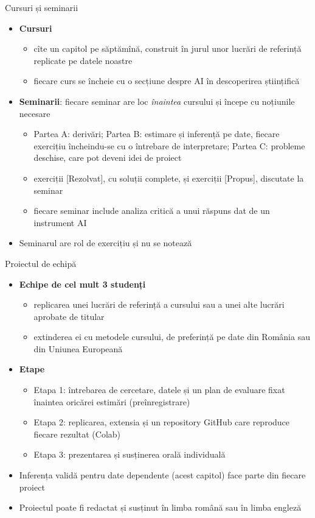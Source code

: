 \begin{frame}{Cursuri și seminarii}
\itemsize{\footnotesize}
\begin{itemize}
    \item \textbf{Cursuri}
    \begin{itemize}
        \item cîte un capitol pe săptămînă, construit în jurul unor lucrări de referință replicate pe datele noastre
        \item fiecare curs se încheie cu o secțiune despre AI în descoperirea științifică
    \end{itemize}
    \item \textbf{Seminarii}: fiecare seminar are loc \emph{înaintea} cursului și începe cu noțiunile necesare
    \begin{itemize}
        \item Partea A: derivări; Partea B: estimare și inferență pe date, fiecare exercițiu încheindu-se cu o întrebare de interpretare; Partea C: probleme deschise, care pot deveni idei de proiect
        \item exerciții [Rezolvat], cu soluții complete, și exerciții [Propus], discutate la seminar
        \item fiecare seminar include analiza critică a unui răspuns dat de un instrument AI
    \end{itemize}
    \item Seminarul are rol de exercițiu și nu se notează
\end{itemize}
\end{frame}

\begin{frame}{Proiectul de echipă}
\itemsize{\footnotesize}
\begin{itemize}
    \item \textbf{Echipe de cel mult 3 studenți}
    \begin{itemize}
        \item replicarea unei lucrări de referință a cursului sau a unei alte lucrări aprobate de titular
        \item extinderea ei cu metodele cursului, de preferință pe date din România sau din Uniunea Europeană
    \end{itemize}
    \item \textbf{Etape}
    \begin{itemize}
        \item Etapa 1: întrebarea de cercetare, datele și un plan de evaluare fixat înaintea oricărei estimări (preînregistrare)
        \item Etapa 2: replicarea, extensia și un repository GitHub care reproduce fiecare rezultat (Colab)
        \item Etapa 3: prezentarea și susținerea orală individuală
    \end{itemize}
    \item Inferența validă pentru date dependente (acest capitol) face parte din fiecare proiect
    \item Proiectul poate fi redactat și susținut în limba română sau în limba engleză
\end{itemize}
\end{frame}

